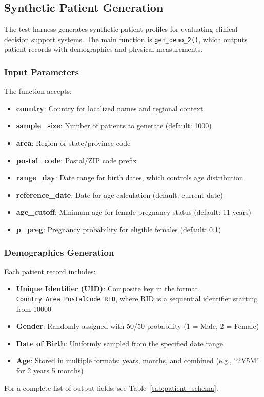 
\subsection{Synthetic Patient Generation}

The test harness generates synthetic patient profiles for evaluating clinical decision support systems. The main function is \texttt{gen\_demo\_2()}, which outputs patient records with demographics and physical measurements.

\subsubsection{Input Parameters}

The function accepts:
\begin{itemize}
    \item \textbf{country}: Country for localized names and regional context
    \item \textbf{sample\_size}: Number of patients to generate (default: 1000)
    \item \textbf{area}: Region or state/province code
    \item \textbf{postal\_code}: Postal/ZIP code prefix
    \item \textbf{range\_day}: Date range for birth dates, which controls age distribution
    \item \textbf{reference\_date}: Date for age calculation (default: current date)
    \item \textbf{age\_cutoff}: Minimum age for female pregnancy status (default: 11 years)
    \item \textbf{p\_preg}: Pregnancy probability for eligible females (default: 0.1)
\end{itemize}

\subsubsection{Demographics Generation}

Each patient record includes:
\begin{itemize}
    \item \textbf{Unique Identifier (UID)}: Composite key in the format \texttt{Country\_Area\_PostalCode\_RID}, where RID is a sequential identifier starting from 10000
    \item \textbf{Gender}: Randomly assigned with 50/50 probability (1 = Male, 2 = Female)
    \item \textbf{Date of Birth}: Uniformly sampled from the specified date range
    \item \textbf{Age}: Stored in multiple formats: years, months, and combined (e.g., ``2Y5M'' for 2 years 5 months)
\end{itemize}
For a complete list of output fields, see Table~\ref{tab:patient_schema}.


